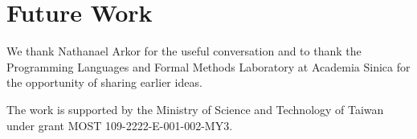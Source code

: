 \documentclass[acmsmall,screen]{acmart}
\theoremstyle{acmdefinition}
\begin{document}
\citep{Xie2018}

\section{Future Work}
\begin{acks}
We thank Nathanael Arkor for the useful conversation and to thank the Programming Languages and Formal Methods Laboratory at Academia Sinica for the opportunity of sharing earlier ideas.

The work is supported by the Ministry of Science and Technology of Taiwan under grant MOST 109-2222-E-001-002-MY3.
\end{acks}



\end{document}
